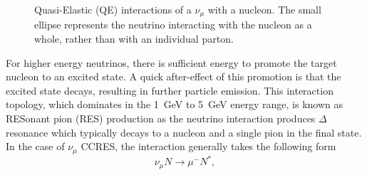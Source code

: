 \begin{figure}%
  \centering
  \caption{Quasi-Elastic (QE) interactions of a $\nu_\mu$ with a nucleon.  The small ellipse represents the neutrino interacting with the nucleon as a whole, rather than with an individual parton.}
  \label{fig:QEFD}
\end{figure}
\newline
\newline
For higher energy neutrinos, there is sufficient energy to promote the target nucleon to an excited state.  A quick after-effect of this promotion is that the excited state decays, resulting in further particle emission.  This interaction topology, which dominates in the 1~GeV to 5~GeV energy range, is known as RESonant pion (RES) production as the neutrino interaction produces $\Delta$ resonance which typically decays to a nucleon and a single pion in the final state.  In the case of $\nu_\mu$ CCRES, the interaction generally takes the following form
\begin{equation}
\nu_\mu N \rightarrow \mu^- N^{*},
\label{eq:CCRES}
\end{equation}
